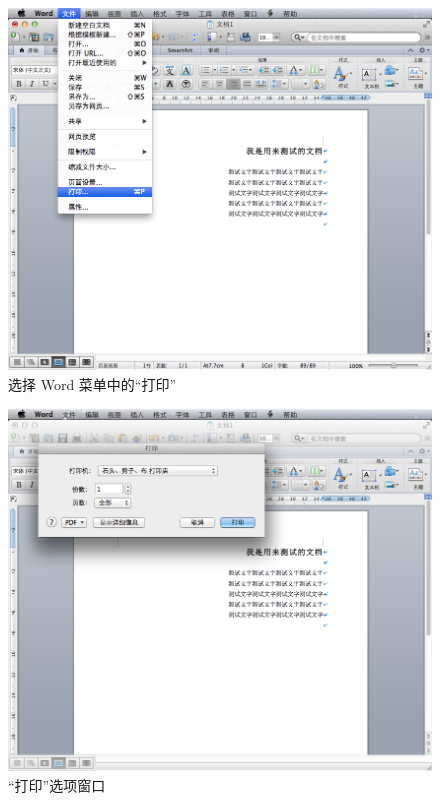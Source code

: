 \documentclass{article}
\begin{document}
\begin{CJK}{UTF8}{gbsn}
				\begin{figure}[hp]
					\centering
					\includegraphics[height=0.45\textheight]{word_mac.png}
					\caption{选择 Word 菜单中的``打印''}
					\label{fig:word_mac}
				\end{figure}
				\begin{figure}[hp]
					\centering
					\includegraphics[height=0.45\textheight]{print_mac.png}
					\caption{``打印''选项窗口}
					\label{fig:print_mac}
				\end{figure}
				\clearpage
				

\end{CJK}
\end{document}
